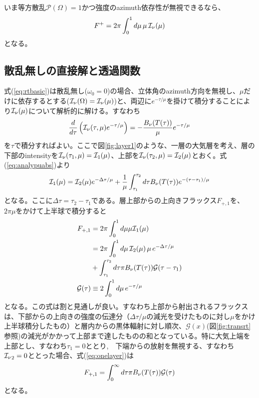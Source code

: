 いま等方散乱$\mathcal{P} (\Omega )=1$かつ強度のazimuth依存性が無視できるなら、
\begin{align}
F^+ = 2 \pi \int_0^1 d \mu \, \mu \,{\mathcal{I}_\nu} (\mu)
\end{align}
となる。


\subsection*{散乱無しの直接解と透過関数}

式(\ref{eq:rtbasic})は散乱無し($\omega_0=0$)の場合、立体角のazimuth方向を無視し、$\mu$だけに依存するとする(${\mathcal{I}_\nu}(\Omega) = {\mathcal{I}_\nu}(\mu)$)と、両辺に$e^{-\tau/\mu}$を掛けて積分することにより${\mathcal{I}_\nu}(\mu)$について解析的に解ける。すなわち
\begin{align}
\label{eq:analypuabs}
\frac{d}{d \tau} \left( {\mathcal{I}_\nu}(\tau,\mu) e^{-\tau/\mu} \right) = - \frac{B_\nu (T(\tau))}{\mu} e^{-\tau/\mu}
\end{align}
を$\tau$で積分すればよい。ここで図\ref{fig:layer1}のような、一層の大気層を考え、層の下部のintensityを${\mathcal{I}_\nu}(\tau_1,\mu) = {\mathcal{I}}_1(\mu)$、上部を${\mathcal{I}_\nu}(\tau_2,\mu) = {\mathcal{I}}_2(\mu)$とおく。式(\ref{eq:analypuabs})より
\begin{align}
{\mathcal{I}}_1 (\mu) = {\mathcal{I}}_2 (\mu) e^{-\Delta \tau/\mu} + \frac{1}{\mu} \int_{\tau_1}^{\tau_2} d \tau B_\nu (T(\tau)) e^{- (\tau - \tau_1)/\mu}  
\end{align}
となる。ここに$\Delta \tau=\tau_2-\tau_1$である。層上部からの上向きフラックス$F_{+,1}$を、$2 \pi \mu$をかけて上半球で積分すると
\begin{align}
\label{eq:onelayer}
F_{+,1} &= 2 \pi \int_{0}^1 d\mu \mu {\mathcal{I}}_1 (\mu) \\
&= 2 \pi \int_{0}^1 d\mu \, {\mathcal{I}}_2 (\mu) \, \mu \, e^{-\Delta \tau/\mu} \nonumber \\
&+  \int_{\tau_1}^{\tau_2} d \tau \pi B_\nu (T(\tau)) \mathcal{G} (\tau - \tau_1) \\
\mathcal{G} (\tau) &\equiv2 \int_{0}^1 d\mu \, e^{-\tau/\mu}
\end{align}
となる。この式は割と見通しが良い。すなわち上部から射出されるフラックスは、下部からの上向きの強度の伝達分（$\Delta \tau/\mu$の減光を受けたものに対し$\mu$をかけ上半球積分したもの）と層内からの黒体輻射に対し順次、$\mathcal{G} (x)$(図\ref{fig:transrt}参照)の減光がかかって上部まで達したものの和となっている。特に大気上端を上部とし、すなわち$\tau_1=0$ととり,　下端からの放射を無視する、すなわち${\mathcal{I}_\nu}_2=0$ととった場合、式(\ref{eq:onelayer})は
\begin{align}
\label{eq:onelayer}
F_{+,1} = \int_{0}^{\infty} d \tau \pi B_\nu (T(\tau)) \mathcal{G} (\tau) 
\end{align}
となる。

